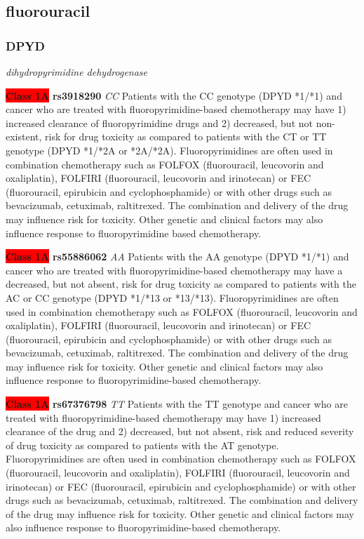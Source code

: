 \documentclass{report}
\begin{document}
\subsection{ fluorouracil }\subsubsection{ DPYD }
\textit{ dihydropyrimidine dehydrogenase } \newline


\textbf{\colorbox{red} {Class 1A}} \textbf{ rs3918290 } \textit{ CC }
Patients with the CC genotype (DPYD *1/*1) and cancer who are treated with fluoropyrimidine-based chemotherapy may have 1) increased clearance of fluoropyrimidine drugs and 2) decreased, but not non-existent, risk for drug toxicity as compared to patients with the CT or TT genotype (DPYD *1/*2A or *2A/*2A). Fluoropyrimidines are often used in combination chemotherapy such as FOLFOX (fluorouracil, leucovorin and oxaliplatin), FOLFIRI (fluorouracil,  leucovorin and irinotecan) or FEC (fluorouracil, epirubicin and cyclophosphamide) or with other drugs such as bevacizumab, cetuximab, raltitrexed. The combination and delivery of the drug may influence risk for toxicity. Other genetic and clinical factors may also influence response to fluoropyrimidine based chemotherapy.\newline

\textbf{\colorbox{red} {Class 1A}} \textbf{ rs55886062 } \textit{ AA }
Patients with the AA genotype (DPYD *1/*1) and cancer who are treated with fluoropyrimidine-based chemotherapy may have a decreased, but not absent, risk for drug toxicity as compared to patients with the AC or CC genotype (DPYD *1/*13 or *13/*13). Fluoropyrimidines are often used in combination chemotherapy such as FOLFOX (fluorouracil, leucovorin and oxaliplatin), FOLFIRI (fluorouracil, leucovorin and irinotecan) or FEC (fluorouracil, epirubicin and cyclophosphamide) or with other drugs such as bevacizumab, cetuximab, raltitrexed. The combination and delivery of the drug may influence risk for toxicity. Other genetic and clinical factors may also influence response to fluoropyrimidine-based chemotherapy.\newline

\textbf{\colorbox{red} {Class 1A}} \textbf{ rs67376798 } \textit{ TT }
Patients with the TT genotype and cancer who are treated with fluoropyrimidine-based chemotherapy may have 1) increased clearance of the drug and 2) decreased, but not absent, risk and reduced severity of drug toxicity as compared to patients with the AT genotype. Fluoropyrimidines are often used in combination chemotherapy such as FOLFOX (fluorouracil, leucovorin and oxaliplatin), FOLFIRI (fluorouracil, leucovorin and irinotecan) or FEC (fluorouracil, epirubicin and cyclophosphamide) or with other drugs such as bevacizumab, cetuximab, raltitrexed. The combination and delivery of the drug may influence risk for toxicity. Other genetic and clinical factors may also influence response to fluoropyrimidine-based chemotherapy.\newline
\end{document}
